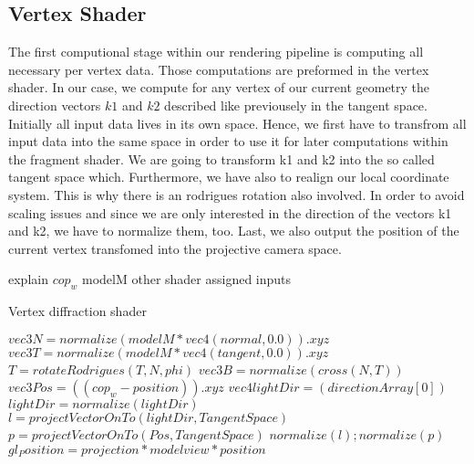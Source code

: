 \subsection{Vertex Shader}
The first computional stage within our rendering pipeline is computing all necessary per vertex data. Those computations are preformed in the vertex shader. In our case, we compute for any vertex of our current geometry the direction vectors $k1$ and $k2$ described like previousely in the tangent space. Initially all input data lives in its own space. Hence, we first have to transfrom all input data into the same space in order to use it for later computations within the fragment shader. We are going to transform k1 and k2 into the so called tangent space which. Furthermore, we have also to realign our local coordinate system. This is why there is an rodrigues rotation also involved. In order to avoid scaling issues and since we are only interested in the direction of the vectors k1 and k2, we have to normalize them, too. Last, we also output the position of the current vertex transfomed into the projective camera space.
  
explain $cop_w$
modelM
other shader assigned inputs

\begin{algorithm}
  \caption{Vertex diffraction shader}
  \begin{algorithmic}
      \State $ vec3 N = normalize(modelM * vec4(normal,0.0)).xyz$
      \State $ vec3 T = normalize(modelM * vec4(tangent,0.0)).xyz$
      \State $ T = rotateRodrigues(T, N, phi)$
      \State $ vec3 B = normalize(cross(N, T))$
      \State $ vec3 Pos = ((cop_w-position)).xyz$
      \State $ vec4 lightDir = (directionArray[0])$
      \State $ lightDir = normalize(lightDir)$
      \State $ l = projectVectorOnTo(lightDir, TangentSpace)$
      \State $ p = projectVectorOnTo(Pos, TangentSpace)$
      \State $normalize(l); normalize(p)$
      \State $gl_Position = projection * modelview * position$
    \EndFor
  \end{algorithmic}
\end{algorithm}


